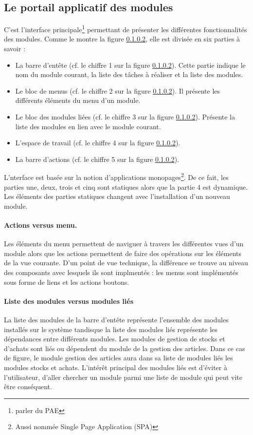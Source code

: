 \documentclass[a4paper,11pt]{report}
\begin{document}
\subsection{Le portail applicatif des modules}
C'est l'interface principale\footnote{parler du PAE} permettant 
de présenter les différentes fonctionnalités des modules. Comme
le montre la figure \ref{}, elle est divisée en six parties à savoir :

\begin{itemize}
\item La barre d'entête (cf. le chiffre 1 sur la figure \ref{}). Cette
  partie indique le nom du module courant, la liste des tâches à
  réaliser et la liste des modules.
\item  Le bloc de menus  (cf. le chiffre 2 sur la figure \ref{}). Il
  présente les différents éléments du menu d'un module.
\item Le bloc des modules liées  (cf. le chiffre 3 sur la figure
  \ref{}). Présente la liste des modules en lien avec le module courant.
\item  L'espace de travail  (cf. le chiffre 4 sur la figure
  \ref{}).
  
\item La barre d'actions  (cf. le chiffre 5 sur la figure \ref{}). 
 
\end{itemize}

L'nterface est basée sur la notion d'applications
monopages\footnote{Aussi nommée Single Page Application (SPA) }.
De ce fait, les parties une, deux, trois et cinq sont statiques alors
que la partie 4 est dynamique. Les éléments des parties statiques
changent avec l'installation d'un nouveau module.
   
\paragraph{Actions versus menu.}
Les éléments du menu permettent de naviguer à travers les
différentes vues d'un module alors que les actions permettent de
faire des opérations sur les éléments de la vue courante. D'un point
de vue technique, la différence se trouve au niveau des composants avec
lesquels ils sont implmentés : les menus sont implémentés   sous forme
de liens et les actions boutons. 

\paragraph{Liste des modules versus modules liés}
La liste des modules de la barre d'entête représente l'ensemble des
modules installés sur le système tandisque la liste des modules liés
représente les dépendances entre différents modules. Les modules de
gestion de stocks et d'achats sont liés ou dépendent du module de la
gestion des articles. Dans ce cas de figure, le module gestion des
articles aura dans sa liste de modules liés les modules stocks et
achats. L'intérêt principal des modules liés est d'éviter à
l'utilisateur, d'aller chercher un module parmi une liste de module
qui peut vite être conséquent.
\end{document}
